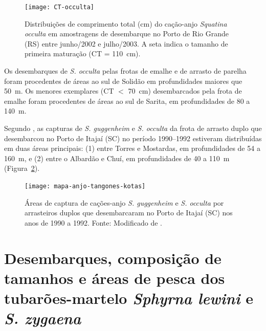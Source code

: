 \documentclass[a4paper,11pt,twoside,showtrims,onecolumn,openright,final]{memoir}
\begin{document}
%
%

\begin{figure}
\begin{center}
\texttt{[image: CT-occulta]}
\end{center}
\caption[Distribuições de comprimento total do cação-anjo \emph{Squatina occulta}.]
        {Distribuições de comprimento total (cm) do cação-anjo \emph{Squatina occulta} 
         em amostragens de desembarque no Porto de Rio Grande (RS) entre junho/2002 e julho/2003.
	 A seta indica o tamanho de primeira maturação (CT = 110~cm).}
\label{fig:ct-occulta}
\end{figure}


Os desembarques de \emph{S. occulta} pelas frotas de emalhe e de arrasto de parelha foram 
procedentes de áreas ao sul de Solidão em profundidades maiores que 50~m. Os 
menores exemplares (CT $<$ 70~cm) desembarcados pela frota de emalhe foram procedentes 
de áreas ao sul de Sarita, em profundidades de 80 a 140~m. 

Segundo \citet{kotas1998}, as capturas de \emph{S. guggenheim} e \emph{S. occulta} da frota de arrasto 
duplo que desembarcou no Porto de Itajaí (SC) no período 1990--1992 estiveram 
distribuídas em duas áreas principais: 
(1) entre Torres e Mostardas, em profundidades de 54 a 160~m, e 
(2) entre o Albardão e Chuí, em profundidades de 40 a 110~m (Figura~\ref{fig:mapakotas-anjo}).


%
%

\begin{figure}
\begin{center}
\texttt{[image: mapa-anjo-tangones-kotas]}
\end{center}
\caption[Áreas de captura de cações-anjo \emph{S. guggenheim} e \emph{S. occulta} 
         por arrasteiros duplos que desembarcaram no Porto de Itajaí (SC) nos anos de 1990 a 1992.]
        {Áreas de captura de cações-anjo \emph{S. guggenheim} e \emph{S. occulta} 
	 por arrasteiros duplos que desembarcaram no Porto de Itajaí (SC) nos anos de 1990 a 1992. 
	 Fonte: Modificado de \citet{kotas1998}.}
\label{fig:mapakotas-anjo}
\end{figure}



\section*{Desembarques, composição de tamanhos e áreas de pesca 
         dos tubarões-martelo \emph{Sphyrna lewini} e \emph{S. zygaena}}
 
\end{document}
